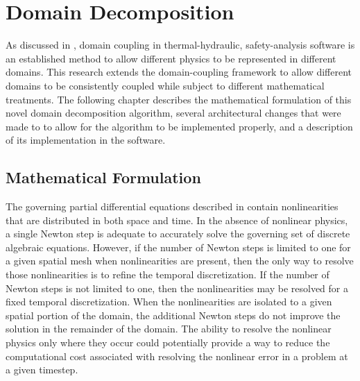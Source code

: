 \chapter{Domain Decomposition}
\label{chap:domDecomposition}
As discussed in , domain coupling in thermal-hydraulic, safety-analysis software is an established method to allow different physics to be represented in different domains.
This research extends the domain-coupling framework to allow different domains to be consistently coupled while subject to different mathematical treatments.
The following chapter describes the mathematical formulation of this novel domain decomposition algorithm, several architectural changes that were made to \cobra{} to allow for the algorithm to be implemented properly, and a description of its implementation in the software.

\section{Mathematical Formulation}
\label{sec:domDecompMath}

The governing partial differential equations described in  contain nonlinearities that are distributed in both space and time.
In the absence of nonlinear physics, a single Newton step is adequate to accurately solve the governing set of discrete algebraic equations.
However, if the number of Newton steps is limited to one for a given spatial mesh when nonlinearities are present, then the only way to resolve those nonlinearities is to refine the temporal discretization.
If the number of Newton steps is not limited to one, then the nonlinearities may be resolved for a fixed temporal discretization.
When the nonlinearities are isolated to a given spatial portion of the domain, the additional Newton steps do not improve the solution in the remainder of the domain.
The ability to resolve the nonlinear physics only where they occur could potentially provide a way to reduce the computational cost associated with resolving the nonlinear error in a problem at a given timestep.

